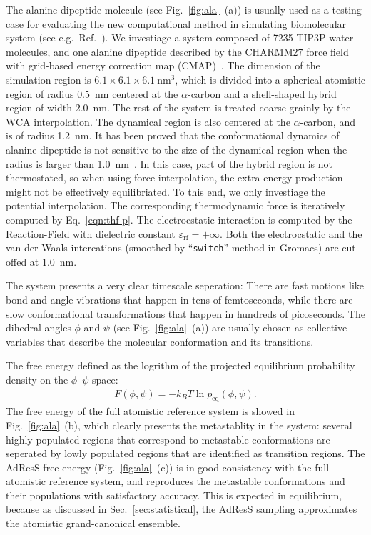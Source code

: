 \documentclass[epjST]{svjour}
\newcommand{\equi}{{\textrm{eq}}}
\begin{document}
The alanine dipeptide molecule (see Fig.~\ref{fig:ala}~(a)) is usually
used as a testing case for evaluating the new computational method in simulating 
biomolecular system (see e.g.~Ref.~\cite{apostolakis1999calculation,chodera2007automatic,kaminsky2007force,gfeller2007complex}).
We investiage a system composed of
7235 TIP3P water molecules, and
one alanine dipeptide described by the CHARMM27 force field~\cite{foloppe2000all} with
grid-based energy correction map (CMAP)~\cite{mackerell2004extending}. 
The dimension of the simulation region is $6.1\times6.1\times6.1~\textrm{nm}^3$, which is divided into
a spherical atomistic region of radius  $0.5$~nm centered at the $\alpha$-carbon and a  shell-shaped hybrid region of width 2.0~nm.
The rest of the system is treated coarse-grainly by the WCA interpolation.
The dynamical region  is
also centered at the $\alpha$-carbon, and is of radius 1.2~nm.
It has been proved that the conformational dynamics of alanine dipeptide is not sensitive to the size of
the dynamical region when the radius is larger than 1.0~nm~\cite{wang2014exploring}.
In this case, part of the hybrid region is not thermostated, so
when using force interpolation, the extra energy production might not be effectively equilibriated.
To this end, we only investiage the potential interpolation. The corresponding
thermodynamic force is iteratively computed by
Eq.~\eqref{eqn:thf-p}.
The electrocstatic interaction is computed by the Reaction-Field with dielectric constant $\varepsilon_{\textrm{rf}} = +\infty$.
Both the electrocstatic and the van der Waals intercations (smoothed by ``\texttt{switch}'' method in Gromacs)
are cut-offed at 1.0~nm.

The system presents a very clear timescale seperation: There are fast
motions like bond and angle vibrations that happen in tens of femtoseconds, while
there are slow conformational transformations that happen in hundreds of picoseconds.
The dihedral angles $\phi$ and $\psi$ (see
Fig.~\ref{fig:ala}~(a)) are usually chosen as collective variables that  describe
the molecular conformation and its transitions.

The free energy defined as the logrithm of the projected equilibrium probability density on the
$\phi$--$\psi$ space:
\begin{align}
  F(\phi,\psi) = -k_BT \ln p_\equi(\phi,\psi).
\end{align}
The free energy of the full atomistic reference system is showed in
Fig.~\ref{fig:ala}~(b), which clearly presents the metastablity in the
system: several highly populated regions that correspond to metastable
conformations are seperated by lowly populated regions that are
identified as transition regions.
The AdResS free energy (Fig.~\ref{fig:ala}~(c)) is in good
consistency with the full atomistic reference system, and
reproduces the metastable conformations and their populations
with satisfactory accuracy.
This is expected in equilibrium, because as discussed in
Sec.~\ref{sec:statistical}, the AdResS sampling approximates the
atomistic grand-canonical ensemble.
\end{document}
